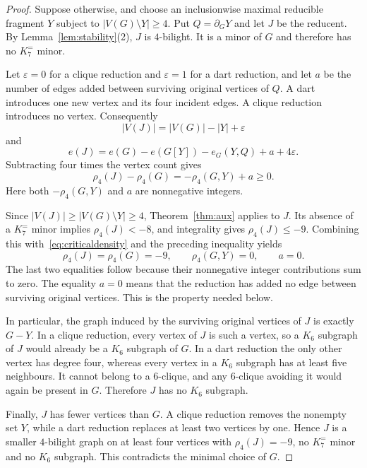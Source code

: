 \documentclass[10pt,a4paper]{amsart}
\newcommand{\Ke}{K_7^{=}}
\newcommand{\dd}{\partial}
\begin{document}
\begin{proof}
Suppose otherwise, and choose an inclusionwise maximal reducible fragment $Y$ subject to $|V(G)\setminus Y|\ge4$. Put $Q=\dd_GY$ and let $J$ be the reducent. By Lemma~\ref{lem:stability}(2), $J$ is $4$-bilight. It is a minor of $G$ and therefore has no $\Ke$ minor.

Let $\varepsilon=0$ for a clique reduction and $\varepsilon=1$ for a dart reduction, and let $a$ be the number of edges added between surviving original vertices of $Q$. A dart introduces one new vertex and its four incident edges. A clique reduction introduces no vertex. Consequently
\[
|V(J)|=|V(G)|-|Y|+\varepsilon
\]
and
\[
e(J)=e(G)-e(G[Y])-e_G(Y,Q)+a+4\varepsilon.
\]
Subtracting four times the vertex count gives
\[
\rho_4(J)-\rho_4(G)=-\rho_4(G,Y)+a\ge0.
\]
Here both $-\rho_4(G,Y)$ and $a$ are nonnegative integers.

Since $|V(J)|\ge|V(G)\setminus Y|\ge4$, Theorem~\ref{thm:aux} applies to $J$. Its absence of a $\Ke$ minor implies $\rho_4(J)<-8$, and integrality gives $\rho_4(J)\le-9$. Combining this with~\eqref{eq:criticaldensity} and the preceding inequality yields
\begin{equation}\label{eq:zero}
\rho_4(J)=\rho_4(G)=-9,\qquad
\rho_4(G,Y)=0,\qquad a=0.
\end{equation}
The last two equalities follow because their nonnegative integer contributions sum to zero. The equality $a=0$ means that the reduction has added no edge between surviving original vertices. This is the property needed below.

In particular, the graph induced by the surviving original vertices of $J$ is exactly $G-Y$. In a clique reduction, every vertex of $J$ is such a vertex, so a $K_6$ subgraph of $J$ would already be a $K_6$ subgraph of $G$. In a dart reduction the only other vertex has degree four, whereas every vertex in a $K_6$ subgraph has at least five neighbours. It cannot belong to a 6-clique, and any 6-clique avoiding it would again be present in $G$. Therefore $J$ has no $K_6$ subgraph.

Finally, $J$ has fewer vertices than $G$. A clique reduction removes the nonempty set $Y$, while a dart reduction replaces at least two vertices by one. Hence $J$ is a smaller $4$-bilight graph on at least four vertices with $\rho_4(J)=-9$, no $\Ke$ minor and no $K_6$ subgraph. This contradicts the minimal choice of $G$.
\end{proof}
\end{document}
